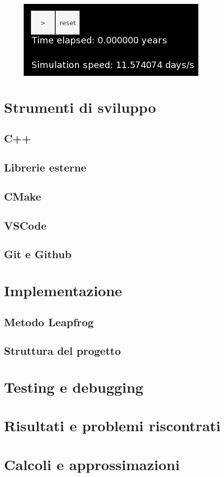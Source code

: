 \documentclass{article}
\begin{document}
\begin{figure} [H]
    \centering
    \includegraphics[height=.42\linewidth]{Playpause.png}
  \label{inclinometro}
\end{figure}

\section{Strumenti di sviluppo}
\subsection{C++}
\subsection{Librerie esterne}
\subsection{CMake}
\subsection{VSCode}
\subsection{Git e Github}
\section{Implementazione}
\subsection{Metodo Leapfrog}
\subsection{Struttura del progetto}
\section{Testing e debugging}
\section{Risultati e problemi riscontrati}
\appendix 
\section{Calcoli e approssimazioni}
\end{document}
